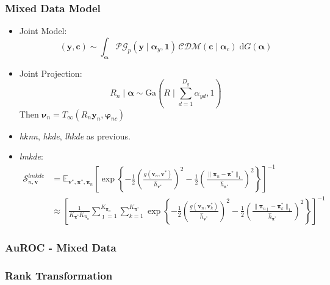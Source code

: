 \documentclass[aspectratio=169,10pt]{beamer}
\begin{document}
\begin{frame}
    \frametitle{Mixed Data Model}
    {\small 
    \begin{itemize}
        \item Joint Model:
        \[
        (\bm{y},\bm{c}) \sim \int_{\bm{\alpha}}
            \mathcal{PG}_p(\bm{y}\mid\bm{\alpha}_y,\bm{1})\,
            \mathcal{CDM}(\bm{c}\mid\bm{\alpha}_c)\;\text{d}G(\bm{\alpha})
        \]
        \item Joint Projection:
        \[
            R_n \mid \bm{\alpha} \sim \text{Ga}\left(R\mid\sum_{d = 1}^{D_y} \alpha_{yd}, 1\right)
        \]
        Then $\bm{\nu}_n = T_{\infty}(R_n\bm{y}_n,\bm{\varphi}_{nc})$
        \item \emph{h$k$nn}, \emph{hkde}, \emph{lhkde} as previous.
        \item \emph{lmkde}:
        \[
        \begin{aligned}
            \mathcal{S}_{n,\bm{v}}^{lmkde} &= \mathbb{E}_{\bm{v}^*,\bm{\pi}^*,\bm{\pi}_n}\left[
        \exp
        \left\lbrace 
        -\frac{1}{2}
        \left(
        \frac{g\left(\bm{v}_n, \bm{v}^*\right)}{\hat{h}_{\bm{v}^*}}
        \right)^2
        -\frac{1}{2}
        \left(
        \frac{\lVert\bm{\pi}_n - \bm{\pi}^*\rVert_1}{\hat{h}_{\bm{\pi}^*}}
        \right)^2
        \right\rbrace
        \right]^{-1}\\
        &\approx \left[\frac{1}{K_{\bm{\pi}^*}K_{\bm{\pi}_n}}
            \sum_{\jmath = 1}^{K_{\bm{\pi}_n}}\sum_{k=1}^{K_{\bm{\pi}^*}}
            \exp\left\lbrace-\frac{1}{2}
            \left(\frac{g(\bm{v}_n,\bm{v}_k^*)}{\hat{h}_{\bm{v}^*}}\right)^2
            -\frac{1}{2}\left(
            \frac{\lVert\bm{\pi}_{n\jmath} - \bm{\pi}_k^*\rVert_1}{\hat{h}_{\bm{\pi}^*}}
            \right)^2
            \right\rbrace\right]^{-1}
        \end{aligned}
        \]
    \end{itemize}
    }
\end{frame} %

\begin{frame}
    \frametitle{AuROC - Mixed Data}
    \begin{table}
        \centering
        
    \end{table}
\end{frame} %

\subsubsection{Rank Transformation}
\end{document}
